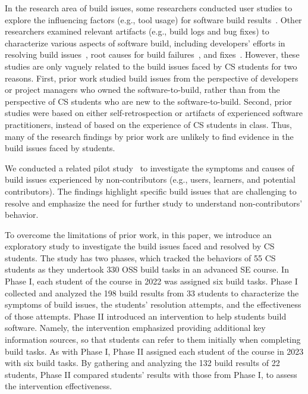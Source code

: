 In the research area of build issues, some researchers conducted user studies to explore the influencing factors (e.g., tool usage) for software build results~\cite{Kwan_Schroter_Damian_2011,downs2012ambient,phillips2014understanding,kerzazi2014automated,hilton2016continuous,vassallo2020every}. Other researchers examined relevant artifacts (e.g., build logs and bug fixes) to characterize various aspects of software build, including developers' efforts in resolving build issues~\cite{mcintosh2011empirical,mcintosh2015large}, root causes for build failures~\cite{xia2014empirical,barrak2021builds,wu2020empirical}, and fixes~\cite{zhao2014empirical,lou2020understanding}. However, these studies are only vaguely related to the build issues faced by CS students for two reasons. First, prior work studied build issues from the perspective of developers or project managers who owned the software-to-build, rather than from the perspective of CS students who are new to the software-to-build. Second, prior studies were based on either self-retrospection or artifacts of experienced software practitioners, instead of based on the experience of CS students in class. Thus, many of the research findings by prior work are unlikely to find evidence in the build issues faced by students.

We conducted a related pilot study~\cite{huang2024build} to investigate the symptoms and causes of build issues experienced by non-contributors (e.g., users, learners, and potential contributors). The findings highlight specific build issues that are challenging to resolve and emphasize the need for further study to understand non-contributors' behavior.

To overcome the limitations of prior work, in this paper, we introduce an exploratory study to investigate the build issues faced and resolved by CS students. The study has two phases, which tracked the behaviors of 55 CS students as they undertook 330 OSS build tasks in an advanced SE course. In Phase I, each student of the course in 2022 was assigned six build tasks. Phase I collected and analyzed the 198 build results from 33 students to characterize the symptoms of build issues, the students' resolution attempts, and the effectiveness of those attempts. Phase II introduced an intervention to help students build software. Namely, the intervention emphasized providing additional key information sources, so that students can refer to them initially when completing build tasks. As with Phase I, Phase II assigned each student of the course in 2023 with six build tasks. By gathering and analyzing the 132 build results of 22 students, Phase II compared students' results with those from Phase I, to assess the intervention effectiveness.

